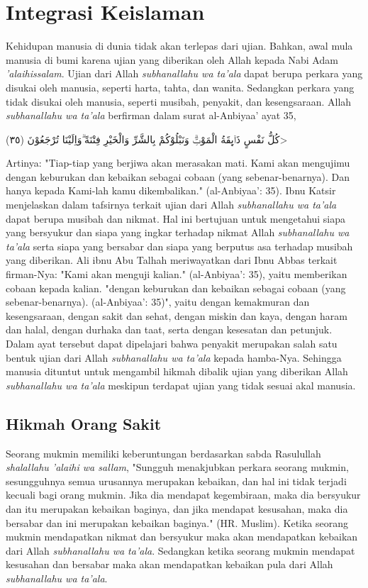 \section{Integrasi Keislaman}
Kehidupan manusia di dunia tidak akan terlepas dari ujian. Bahkan, awal mula manusia di bumi karena ujian yang diberikan oleh Allah kepada Nabi Adam \textit{'alaihissalam}. Ujian dari Allah \textit{subhanallahu wa ta'ala} dapat berupa perkara yang disukai oleh manusia, seperti harta, tahta, dan wanita. Sedangkan perkara yang tidak disukai oleh manusia, seperti musibah, penyakit, dan kesengsaraan. Allah \textit{subhanallahu wa ta'ala} berfirman dalam surat al-Anbiyaa' ayat 35,

\begin{flushright}
    \<كُلُّ نَفْسٍ ذَاۤىِٕقَةُ الْمَوْتِۗ وَنَبْلُوْكُمْ بِالشَّرِّ وَالْخَيْرِ فِتْنَةً ۗوَاِلَيْنَا تُرْجَعُوْنَ (٣٥)>
\end{flushright}

Artinya: "Tiap-tiap yang berjiwa akan merasakan mati. Kami akan mengujimu dengan keburukan dan kebaikan sebagai cobaan (yang sebenar-benarnya). Dan hanya kepada Kami-lah kamu dikembalikan." (al-Anbiyaa': 35). Ibnu Katsir menjelaskan dalam tafsirnya terkait ujian dari Allah \textit{subhanallahu wa ta'ala} dapat berupa musibah dan nikmat. Hal ini bertujuan untuk mengetahui siapa yang bersyukur dan siapa yang ingkar terhadap nikmat Allah \textit{subhanallahu wa ta'ala} serta siapa yang bersabar dan siapa yang berputus asa terhadap musibah yang diberikan. Ali ibnu Abu Talhah meriwayatkan dari Ibnu Abbas terkait firman-Nya: "Kami akan menguji kalian." (al-Anbiyaa': 35), yaitu memberikan cobaan kepada kalian. "dengan keburukan dan kebaikan sebagai cobaan (yang sebenar-benarnya). (al-Anbiyaa': 35)", yaitu dengan kemakmuran dan kesengsaraan, dengan sakit dan sehat, dengan miskin dan kaya, dengan haram dan halal, dengan durhaka dan taat, serta dengan kesesatan dan petunjuk. Dalam ayat tersebut dapat dipelajari bahwa penyakit merupakan salah satu bentuk ujian dari Allah \textit{subhanallahu wa ta'ala} kepada hamba-Nya. Sehingga manusia dituntut untuk mengambil hikmah dibalik ujian yang diberikan Allah \textit{subhanallahu wa ta'ala} meskipun terdapat ujian yang tidak sesuai akal manusia.

    \subsection{Hikmah Orang Sakit}
    Seorang mukmin memiliki keberuntungan berdasarkan sabda Rasulullah \textit{shalallahu 'alaihi wa sallam}, "Sungguh menakjubkan perkara seorang mukmin, sesungguhnya semua urusannya merupakan kebaikan, dan hal ini tidak terjadi kecuali bagi orang mukmin. Jika dia mendapat kegembiraan, maka dia bersyukur dan itu merupakan kebaikan baginya, dan jika mendapat kesusahan, maka dia bersabar dan ini merupakan kebaikan baginya." (HR. Muslim). Ketika seorang mukmin mendapatkan nikmat dan bersyukur maka akan mendapatkan kebaikan dari Allah \textit{subhanallahu wa ta'ala}. Sedangkan ketika seorang mukmin mendapat kesusahan dan bersabar maka akan mendapatkan kebaikan pula dari Allah \textit{subhanallahu wa ta'ala}.

